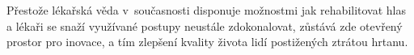 Přestože lékařská věda v~současnosti disponuje možnostmi jak rehabilitovat hlas a lékaři se snaží využívané postupy neustále zdokonalovat, zůstává zde otevřený prostor pro inovace, a tím zlepšení kvality života lidí postižených ztrátou hrtanu.
%
%
%


